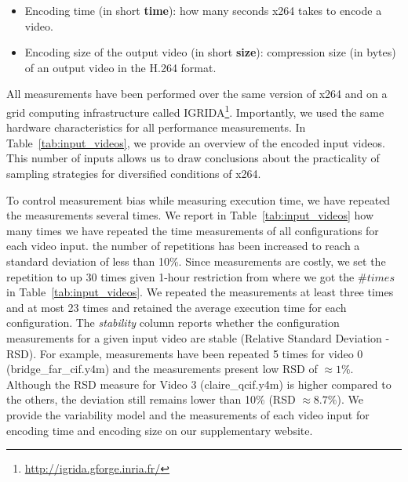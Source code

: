 \begin{itemize}
    \item Encoding time (in short \textbf{time}): how many seconds x264 takes to encode a video.
    \item Encoding size of the output video (in short \textbf{size}): compression size (in bytes) of an output video in the H.264 format.
\end{itemize}

All measurements have been performed over the same version of x264 and on a grid computing infrastructure called IGRIDA\footnote{\url{http://igrida.gforge.inria.fr/}}. 
Importantly, we used the same hardware characteristics for all performance measurements.
In Table~\ref{tab:input_videos}, we provide an overview of the encoded input videos.
This number of inputs allows us to draw conclusions about the practicality of sampling strategies for diversified conditions of x264.

To control measurement bias while measuring execution time, we have repeated the measurements several times.
We report in Table~\ref{tab:input_videos} how many times we have repeated the time measurements of all \nbconfigurations\xspace configurations for each video input. the number of repetitions has been increased to reach a standard deviation of less than 10\%. 
Since measurements are costly, we set the repetition to up 30 times given 1-hour restriction from where we got the $\#times$ in Table~\ref{tab:input_videos}. 
We repeated the measurements at least three times and at most 23 times and retained the average execution time for each configuration. 
The \textit{stability} column reports whether the configuration measurements for a given input video are stable (Relative Standard Deviation - RSD).
For example, measurements have been repeated 5 times for video 0 (bridge\_far\_cif.y4m) and the measurements present low RSD of $\approx{1\%}$.
Although the RSD measure for Video 3 (claire\_qcif.y4m) is higher compared to the others, the deviation still remains lower than 10\% (\ie RSD $\approx{8.7\%}$).
We provide the variability model and the measurements of each video input for encoding time and encoding size on our supplementary website.

